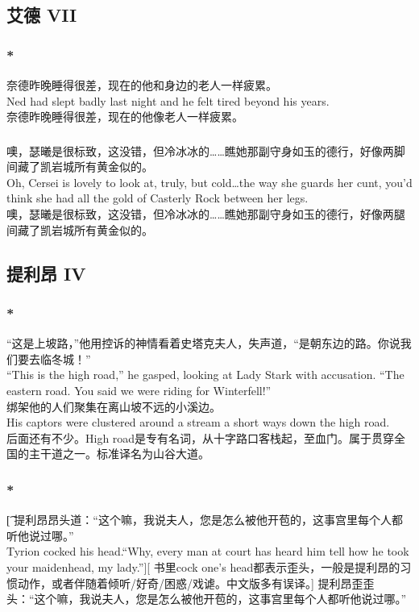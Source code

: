\documentclass[12pt,a4paper]{article}
\newcommand{\h}[1]{{\color{red}#1}\\}
\newcommand{\la}[1]{{\color{blue}#1}\\}
\begin{document}
			
\subsection{艾德 VII}
\subsubsection{\color{red}*}\la{
	奈德昨晚睡得很差，现在的他和身边的老人一样疲累。\\
	Ned had slept badly last night and he felt tired beyond his years.}
	奈德昨晚睡得很差，现在的他像老人一样疲累。
	
\subsubsection{}\la{
	噢，瑟曦是很标致，这没错，但冷冰冰的……瞧她那副守身如玉的德行，好像两脚间藏了凯岩城所有黄金似的。\\
	Oh, Cersei is lovely to look at, truly, but cold\ldots the way she guards her cunt, you'd think she had all the gold of Casterly Rock between her legs.}
	噢，瑟曦是很标致，这没错，但冷冰冰的……瞧她那副守身如玉的德行，好像两腿间藏了凯岩城所有黄金似的。
		
\subsection{提利昂 IV}
\subsubsection{\color{red}*}\la{
“这是上坡路，”他用控诉的神情看着史塔克夫人，失声道，“是朝东边的路。你说我们要去临冬城！”\\
“This is the high road,” he gasped, looking at Lady Stark with accusation. “The eastern road. You said we were riding for Winterfell!”\\
绑架他的人们聚集在离山坡不远的小溪边。\\
His captors were clustered around a stream a short ways down the high road.}\h{
后面还有不少。High road是专有名词，从十字路口客栈起，至血门。属于贯穿全国的主干道之一。标准译名为山谷大道。}

\subsubsection{\color{red}*}\t[
提利昂昂头道：“这个嘛，我说夫人，您是怎么被他开苞的，这事宫里每个人都听他说过哪。”\\
Tyrion cocked his head.“Why, every man at court has heard him tell how he took your maidenhead, my lady.”][
书里cock one's head都表示歪头，一般是提利昂的习惯动作，或者伴随着倾听/好奇/困惑/戏谑。中文版多有误译。]
提利昂歪歪头：“这个嘛，我说夫人，您是怎么被他开苞的，这事宫里每个人都听他说过哪。”
\end{document}

